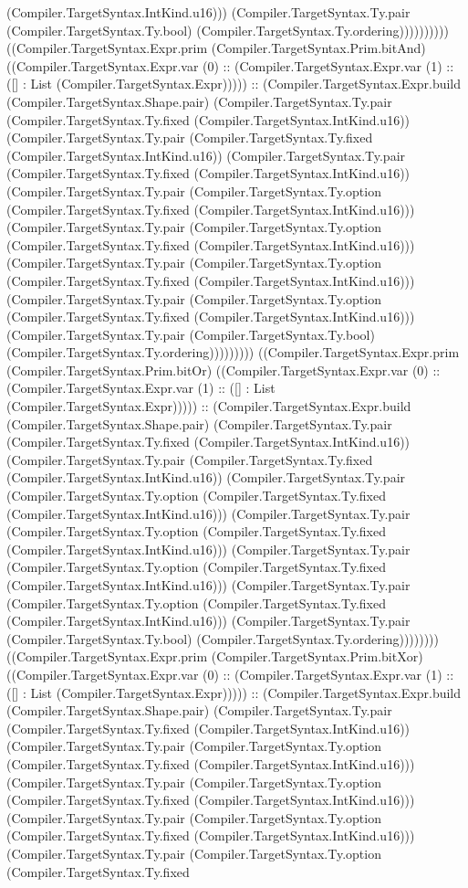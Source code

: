 \documentclass[11pt]{article}
\begin{document}
(Compiler.TargetSyntax.IntKind.u16))) (Compiler.TargetSyntax.Ty.pair (Compiler.TargetSyntax.Ty.bool) (Compiler.TargetSyntax.Ty.ordering)))))))))) ((Compiler.TargetSyntax.Expr.prim (Compiler.TargetSyntax.Prim.bitAnd) ((Compiler.TargetSyntax.Expr.var (0) :: (Compiler.TargetSyntax.Expr.var (1) :: ([] : List (Compiler.TargetSyntax.Expr))))) :: (Compiler.TargetSyntax.Expr.build (Compiler.TargetSyntax.Shape.pair) (Compiler.TargetSyntax.Ty.pair (Compiler.TargetSyntax.Ty.fixed (Compiler.TargetSyntax.IntKind.u16)) (Compiler.TargetSyntax.Ty.pair (Compiler.TargetSyntax.Ty.fixed (Compiler.TargetSyntax.IntKind.u16)) (Compiler.TargetSyntax.Ty.pair (Compiler.TargetSyntax.Ty.fixed (Compiler.TargetSyntax.IntKind.u16)) (Compiler.TargetSyntax.Ty.pair (Compiler.TargetSyntax.Ty.option (Compiler.TargetSyntax.Ty.fixed (Compiler.TargetSyntax.IntKind.u16))) (Compiler.TargetSyntax.Ty.pair (Compiler.TargetSyntax.Ty.option (Compiler.TargetSyntax.Ty.fixed (Compiler.TargetSyntax.IntKind.u16))) (Compiler.TargetSyntax.Ty.pair (Compiler.TargetSyntax.Ty.option (Compiler.TargetSyntax.Ty.fixed (Compiler.TargetSyntax.IntKind.u16))) (Compiler.TargetSyntax.Ty.pair (Compiler.TargetSyntax.Ty.option (Compiler.TargetSyntax.Ty.fixed (Compiler.TargetSyntax.IntKind.u16))) (Compiler.TargetSyntax.Ty.pair (Compiler.TargetSyntax.Ty.bool) (Compiler.TargetSyntax.Ty.ordering))))))))) ((Compiler.TargetSyntax.Expr.prim (Compiler.TargetSyntax.Prim.bitOr) ((Compiler.TargetSyntax.Expr.var (0) :: (Compiler.TargetSyntax.Expr.var (1) :: ([] : List (Compiler.TargetSyntax.Expr))))) :: (Compiler.TargetSyntax.Expr.build (Compiler.TargetSyntax.Shape.pair) (Compiler.TargetSyntax.Ty.pair (Compiler.TargetSyntax.Ty.fixed (Compiler.TargetSyntax.IntKind.u16)) (Compiler.TargetSyntax.Ty.pair (Compiler.TargetSyntax.Ty.fixed (Compiler.TargetSyntax.IntKind.u16)) (Compiler.TargetSyntax.Ty.pair (Compiler.TargetSyntax.Ty.option (Compiler.TargetSyntax.Ty.fixed (Compiler.TargetSyntax.IntKind.u16))) (Compiler.TargetSyntax.Ty.pair (Compiler.TargetSyntax.Ty.option (Compiler.TargetSyntax.Ty.fixed (Compiler.TargetSyntax.IntKind.u16))) (Compiler.TargetSyntax.Ty.pair (Compiler.TargetSyntax.Ty.option (Compiler.TargetSyntax.Ty.fixed (Compiler.TargetSyntax.IntKind.u16))) (Compiler.TargetSyntax.Ty.pair (Compiler.TargetSyntax.Ty.option (Compiler.TargetSyntax.Ty.fixed (Compiler.TargetSyntax.IntKind.u16))) (Compiler.TargetSyntax.Ty.pair (Compiler.TargetSyntax.Ty.bool) (Compiler.TargetSyntax.Ty.ordering)))))))) ((Compiler.TargetSyntax.Expr.prim (Compiler.TargetSyntax.Prim.bitXor) ((Compiler.TargetSyntax.Expr.var (0) :: (Compiler.TargetSyntax.Expr.var (1) :: ([] : List (Compiler.TargetSyntax.Expr))))) :: (Compiler.TargetSyntax.Expr.build (Compiler.TargetSyntax.Shape.pair) (Compiler.TargetSyntax.Ty.pair (Compiler.TargetSyntax.Ty.fixed (Compiler.TargetSyntax.IntKind.u16)) (Compiler.TargetSyntax.Ty.pair (Compiler.TargetSyntax.Ty.option (Compiler.TargetSyntax.Ty.fixed (Compiler.TargetSyntax.IntKind.u16))) (Compiler.TargetSyntax.Ty.pair (Compiler.TargetSyntax.Ty.option (Compiler.TargetSyntax.Ty.fixed (Compiler.TargetSyntax.IntKind.u16))) (Compiler.TargetSyntax.Ty.pair (Compiler.TargetSyntax.Ty.option (Compiler.TargetSyntax.Ty.fixed (Compiler.TargetSyntax.IntKind.u16))) (Compiler.TargetSyntax.Ty.pair (Compiler.TargetSyntax.Ty.option (Compiler.TargetSyntax.Ty.fixed 
\end{document}

